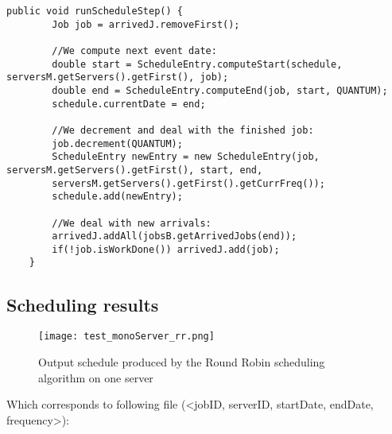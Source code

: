 \documentclass[./report.tex]{subfiles}
\begin{document}
\begin{lstlisting}[style=Java, caption={Source code of a Round Robin \textbf{on a single server} schedule step}]
	public void runScheduleStep() {
		Job job = arrivedJ.removeFirst();
		
		//We compute next event date:
		double start = ScheduleEntry.computeStart(schedule, serversM.getServers().getFirst(), job);
		double end = ScheduleEntry.computeEnd(job, start, QUANTUM);
		schedule.currentDate = end;
		
		//We decrement and deal with the finished job:
		job.decrement(QUANTUM);
		ScheduleEntry newEntry = new ScheduleEntry(job, serversM.getServers().getFirst(), start, end,
		serversM.getServers().getFirst().getCurrFreq());
		schedule.add(newEntry);
		
		//We deal with new arrivals:
		arrivedJ.addAll(jobsB.getArrivedJobs(end));
		if(!job.isWorkDone()) arrivedJ.add(job);
	}
\end{lstlisting}


\newpage
\subsection{Scheduling results}
\begin{figure}[!h]
	\center
	\texttt{[image: test\_monoServer\_rr.png]}
	\caption{Output schedule produced by the Round Robin scheduling algorithm on one server}
	\label{fig:monoServer_rr} 
\end{figure}

Which corresponds to following file (<jobID, serverID, startDate, endDate, frequency>):



\newpage
\end{document}

